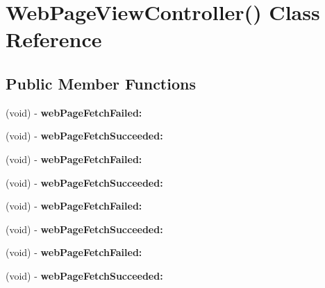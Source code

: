 \hypertarget{interface_web_page_view_controller_07_08}{
\section{\-Web\-Page\-View\-Controller() \-Class \-Reference}
\label{interface_web_page_view_controller_07_08}
}
\subsection*{\-Public \-Member \-Functions}
\begin{DoxyCompactItemize}
\item 
\hypertarget{interface_web_page_view_controller_07_08_af8555d814435593a0c9ace36e8c0e20f}{
(void) -\/ {\bfseries web\-Page\-Fetch\-Failed\-:}}
\label{interface_web_page_view_controller_07_08_af8555d814435593a0c9ace36e8c0e20f}

\item 
\hypertarget{interface_web_page_view_controller_07_08_ab7c3f7ce1cbde7ec6ca9f1fb405bb5a4}{
(void) -\/ {\bfseries web\-Page\-Fetch\-Succeeded\-:}}
\label{interface_web_page_view_controller_07_08_ab7c3f7ce1cbde7ec6ca9f1fb405bb5a4}

\item 
\hypertarget{interface_web_page_view_controller_07_08_af8555d814435593a0c9ace36e8c0e20f}{
(void) -\/ {\bfseries web\-Page\-Fetch\-Failed\-:}}
\label{interface_web_page_view_controller_07_08_af8555d814435593a0c9ace36e8c0e20f}

\item 
\hypertarget{interface_web_page_view_controller_07_08_ab7c3f7ce1cbde7ec6ca9f1fb405bb5a4}{
(void) -\/ {\bfseries web\-Page\-Fetch\-Succeeded\-:}}
\label{interface_web_page_view_controller_07_08_ab7c3f7ce1cbde7ec6ca9f1fb405bb5a4}

\item 
\hypertarget{interface_web_page_view_controller_07_08_af8555d814435593a0c9ace36e8c0e20f}{
(void) -\/ {\bfseries web\-Page\-Fetch\-Failed\-:}}
\label{interface_web_page_view_controller_07_08_af8555d814435593a0c9ace36e8c0e20f}

\item 
\hypertarget{interface_web_page_view_controller_07_08_ab7c3f7ce1cbde7ec6ca9f1fb405bb5a4}{
(void) -\/ {\bfseries web\-Page\-Fetch\-Succeeded\-:}}
\label{interface_web_page_view_controller_07_08_ab7c3f7ce1cbde7ec6ca9f1fb405bb5a4}

\item 
\hypertarget{interface_web_page_view_controller_07_08_af8555d814435593a0c9ace36e8c0e20f}{
(void) -\/ {\bfseries web\-Page\-Fetch\-Failed\-:}}
\label{interface_web_page_view_controller_07_08_af8555d814435593a0c9ace36e8c0e20f}

\item 
\hypertarget{interface_web_page_view_controller_07_08_ab7c3f7ce1cbde7ec6ca9f1fb405bb5a4}{
(void) -\/ {\bfseries web\-Page\-Fetch\-Succeeded\-:}}
\label{interface_web_page_view_controller_07_08_ab7c3f7ce1cbde7ec6ca9f1fb405bb5a4}

\end{DoxyCompactItemize}


